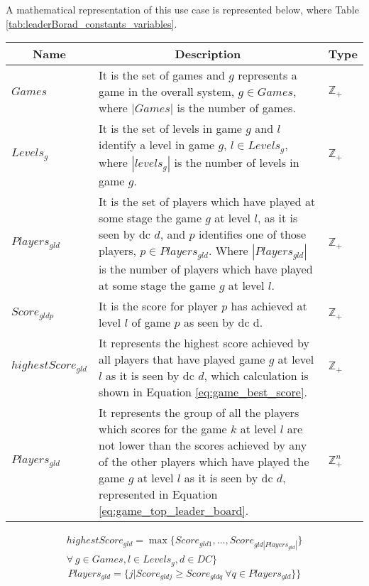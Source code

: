 A mathematical representation of this use case is represented below, where Table \ref{tab:leaderBorad_constants_variables}.
\begin{table*}[!ht]
	\begin{tabular}{|p{2.2cm}|p{13.5cm}|p{.8cm}| }
		\hline
		\multicolumn{1}{|c|}{Name} & \multicolumn{1}{c|}{Description} & \multicolumn{1}{c|}{Type} \\
		\hline
		\hline
			$Games$ & It is the set of games and $g$ represents a game in the overall system, $g \in Games$, where $|Games|$ is the number of games. & $\mathbb{Z}_{+}$ \\
		\hline
			$Levels_{g}$ & It is the set of levels in game $g$ and $l$ identify a level in game $g$, $l \in Levels_{g}$, where $|levels_{g}|$ is the number of levels in game $g$. & $\mathbb{Z}_{+}$ \\
		\hline
			$Players_{gld}$ & It is the set of players which have played at some stage the game $g$ at level $l$, as it is seen by \gls{dc} $d$, and $p$ identifies one of those players, $p \in Players_{gld}$. Where $|Players_{gld}|$ is the number of players which have played at some stage the game $g$ at level $l$. & $\mathbb{Z}_{+}$ \\
		\hline
			$Score_{gldp}$ & It is the score for player $p$ has achieved at level $l$ of game $p$ as seen by \gls{dc} d. & $\mathbb{Z}_{+}$ \\
		\hline
			$highestScore_{gld}$ & It represents the highest score achieved by all players that have played game $g$ at level $l$ as it is seen by \gls{dc} $d$, which calculation is shown in Equation \ref{eq:game_best_score}. & $\mathbb{Z}_{+}$ \\
		\hline
			$Players_{gld}$ & It represents the group of all the players which scores for the game $k$ at level $l$ are not lower than the scores achieved by any of the other players which have played the game $g$ at level $l$ as it is seen by \gls{dc} $d$, represented in Equation \ref{eq:game_top_leader_board}. & $\mathbb{Z}^{n}_{+}$ \\
		\hline
	\end{tabular}
			
	\caption{Leader Board Constants and Variables.}
	\label{tab:leaderBorad_constants_variables}
\end{table*}
\begin{multline} \label{eq:game_best_score}
	highestScore_{gld} = \max\{Score_{gld1},\dots, Score_{gld|Players_{gld}|}\}\\ \forall ~ g \in Games, l \in Levels_{g}, d \in DC\}
\end{multline}
\begin{equation} \label{eq:game_top_leader_board}
	Players_{gld} = \{j | Score_{gldj} \ge Score_{gldq} ~ \forall q \in Players_{gld}\}\}
\end{equation}

